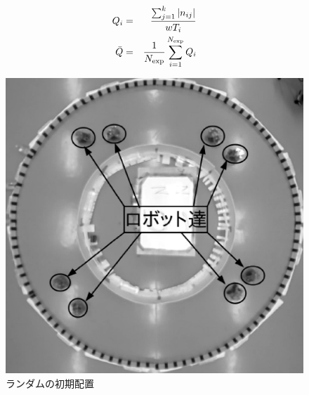 \vspace{-2mm}
\begin{eqnarray}
Q_i &=& \frac{\sum_{j=1}^{k} |n_{ij}|}{wT_i}
\label{eq:flow} \\
\bar{Q} &=& \frac{1}{N_{\rm exp}}\sum_{i=1}^{N_{\rm exp}} Q_i
\label{eq:flow_ave} 
\end{eqnarray}

\vspace{-1mm}
\begin{figure}[h]
    \begin{minipage}{0.49\linewidth}
        \centering
        \includegraphics[width=1.0\linewidth]{startrand.eps}
        \caption{ランダムの初期配置}
        \label{randstart}
    \end{minipage}
    \begin{minipage}{0.49\linewidth}
        \centering

\end{minipage}
\end{figure}
